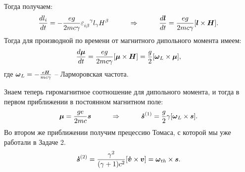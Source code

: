 Тогда получаем:
\begin{equation*}
    \frac{d l_i}{d t} = - \frac{e g}{2 m c \gamma} \varepsilon_{i \beta}^{\phantom{0}\phantom{0}\gamma}  l_\gamma H^\beta
    \hspace{1 cm}
    \Rightarrow
    \hspace{1 cm}
    \frac{d \mbox{\boldmath $l$}}{d t} = \frac{e g}{2 m c \gamma} [\mbox{\boldmath $l$} \times \mbox{\boldmath $H$}].
\end{equation*}
Тогда для производной по времени от магнитного дипольного момента имеем:
\begin{equation*}
    \frac{d \mbox{\boldmath $\mu$}}{d t} = \frac{e g}{2 m c \gamma} [\mbox{\boldmath $\mu$} \times \mbox{\boldmath $H$}] = \frac{g}{2} [\mbox{\boldmath $\omega$}_L \times \mbox{\boldmath $\mu$}],
\end{equation*}
где $\vc{\omega}_L = - \frac{e \smallvc{H}}{m c \gamma}$ -- Ларморовская частота.

Знаем теперь гиромагнитное соотношение для дипольного момента, и тогда в первом приближении в постоянном магнитном поле:
\begin{equation*}
    \mbox{\boldmath $\mu$} = \frac{g e}{2 m c} \mbox{\boldmath $s$}
    \hspace{1 cm}
    \Rightarrow
    \hspace{1 cm}
    \mbox{\boldmath $\dot{s}$}^{(1)} = \frac{g}{2} \gamma [\mbox{\boldmath $\omega$}_L \times \mbox{\boldmath $s$}].
\end{equation*}
Во втором же приближении получим прецессию Томаса, с которой мы уже работали в Задаче 2.
\begin{equation*}
    \mbox{\boldmath $\dot{s}$}^{(2)} = \frac{\gamma^2}{(\gamma+1)c^2} [\mbox{\boldmath $\dot{v}$} \times \mbox{\boldmath $v$}] = \mbox{\boldmath $\omega$}_{th} \times \mbox{\boldmath $s$}.
\end{equation*}

